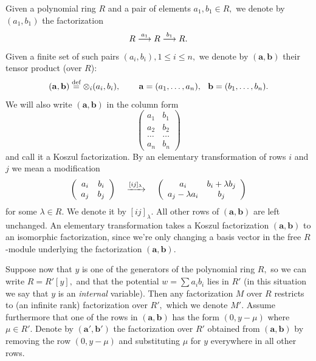 \documentclass[12pt]{article}
\begin{document}
Given a polynomial ring $R$ and a pair of elements $a_1,b_1\in R,$ we denote by 
$(a_1,b_1)$ the factorization 
$$ R \stackrel{a_1}{\longrightarrow} R \stackrel{b_1}{\longrightarrow} R.$$
Given a finite set of such pairs $(a_i,b_i), 1\le i\le n,$ we denote by 
$(\mathbf{a}, \mathbf{b})$ their tensor product (over $R$): 
 $$ ({\mathbf a}, {\mathbf b}) \stackrel{\mbox{\scriptsize{def}}}{=} \otimes_{i} (a_i,b_i), \hspace{0.3in} 
 {\mathbf a}=(a_1, \dots, a_n), \hspace{0.1in} {\mathbf b}=(b_1, \dots, b_n).$$
We will also write $(\mathbf{a}, \mathbf{b})$ in the column form 
$$ \left( \begin{array}{cc} a_1 & b_1 \\
   a_2 & b_2 \\  \dots & \dots  \\ a_n & b_n \end{array} \right) $$
and call it a Koszul factorization. 
By an elementary transformation of rows $i$ and $j$ we mean a modification 
$$\left( \begin{array}{cc} a_i & b_i \\ a_j & b_j \end{array} \right) 
 \hspace{0.15in} \xrightarrow{[ij]_{\lambda}} \hspace{0.15in} 
 \left( \begin{array}{cc} a_i & b_i+\lambda b_j \\ a_j-\lambda 
 a_i & b_j \end{array} \right)$$
for some $\lambda\in R.$ We denote it by $[ij]_{\lambda}.$ 
All other rows of $(\mathbf{a},\mathbf{b})$ are left 
unchanged. An elementary transformation takes a Koszul 
factorization $(\mathbf{a},\mathbf{b})$
to an isomorphic factorization, since we're only changing a 
basis vector in the free $R$-module 
underlying the factorization $(\mathbf{a},\mathbf{b}).$

\vspace{0.1in} 

Suppose now that $y$ is one of the generators of the polynomial ring 
 $R,$ so we can write $R=R'[y],$ and that the potential   
 $w=\sum a_i b_i$ lies in $R'$ (in this situation we say that $y$ 
is an \emph{internal} variable). Then any 
 factorization $M$ over $R$ restricts to (an infinite rank) 
 factorization over $R',$ 
which we denote $M'.$ Assume furthermore that one of the rows in 
$(\mathbf{a},\mathbf{b})$ has the form $(0, y - \mu)$ where $\mu\in R'.$ 
Denote by $(\mathbf{a}',\mathbf{b}')$ the factorization over $R'$ obtained from 
$(\mathbf{a},\mathbf{b})$ by removing the row $(0, y - \mu)$ and substituting 
$\mu$ for $y$ everywhere in all other rows. 
\end{document}
